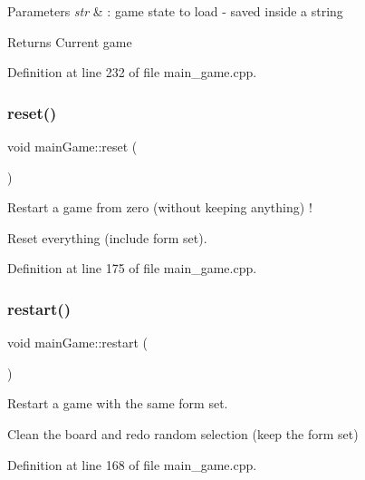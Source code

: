 \begin{DoxyParams}{Parameters}
{\em str} & \+: game state to load -\/ saved inside a string \\
\hline
\end{DoxyParams}
\begin{DoxyReturn}{Returns}
Current game 
\end{DoxyReturn}


Definition at line 232 of file main\+\_\+game.\+cpp.

\hypertarget{classmain_game_a6bf4986a2943277dcfbb24ecb89f8e2f}{}\label{classmain_game_a6bf4986a2943277dcfbb24ecb89f8e2f} 
\subsubsection{\texorpdfstring{reset()}{reset()}}
{\footnotesize\ttfamily void main\+Game\+::reset (\begin{DoxyParamCaption}{ }\end{DoxyParamCaption})}



Restart a game from zero (without keeping anything) ! 

Reset everything (include form set). 

Definition at line 175 of file main\+\_\+game.\+cpp.

\hypertarget{classmain_game_a0fea171cf6984f14904fe4a4c548db2b}{}\label{classmain_game_a0fea171cf6984f14904fe4a4c548db2b} 
\subsubsection{\texorpdfstring{restart()}{restart()}}
{\footnotesize\ttfamily void main\+Game\+::restart (\begin{DoxyParamCaption}{ }\end{DoxyParamCaption})}



Restart a game with the same form set. 

Clean the board and redo random selection (keep the form set) 

Definition at line 168 of file main\+\_\+game.\+cpp.

\hypertarget{classmain_game_aeeb30e985566da9dea9679c6868f22a0}{}\label{classmain_game_aeeb30e985566da9dea9679c6868f22a0} 
